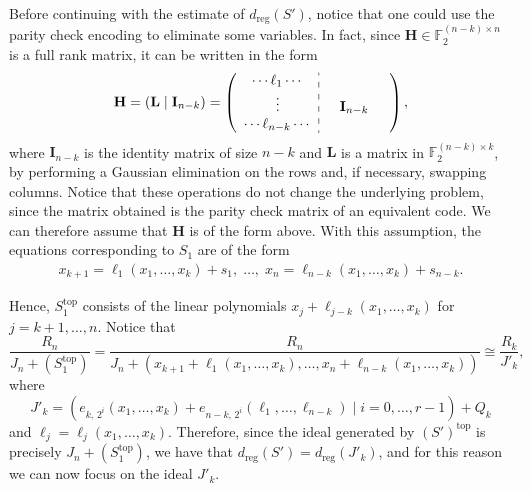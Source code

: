 \documentclass[11pt]{article}
\newcommand{\F}[0]{\mathbb{F}}
\newcommand{\es}[2]{e_{#1,\, #2}}
\DeclarePairedDelimiter{\fl}{\lfloor}{\rfloor}
\theoremstyle{plain}
\theoremstyle{definition}
\theoremstyle{remark}
\begin{document}
Before continuing with the estimate of $d_{\operatorname{reg}}(S')$, notice that one could use the parity check encoding to eliminate some variables. In fact, since $\mathbf{H}\in\F_2^{(n-k)\times n}$ is a full rank matrix, it can be written in the form 
\begin{equation*}
    \mathbf{H}=(\mathbf{L}\mid \mathbf{I}_{n-k})=
    \left(\begin{array}{c : c}
        \cdots\ell_{1}\cdots & \\
        \vdots & \quad \mathbf{I}_{n-k}\quad \\
        \cdots\ell_{n-k}\cdots & \\
    \end{array}\right),
\end{equation*}%
where $\mathbf{I}_{n-k}$ is the identity matrix of size $n-k$ and $\mathbf{L}$ is a matrix in $\F_2^{(n-k)\times k}$, by performing a Gaussian elimination on the rows and, if necessary, swapping columns. Notice that these operations do not change the underlying problem, since the matrix obtained is the parity check matrix of an equivalent code. We can therefore assume that $\mathbf{H}$ is of the form above. With this assumption, the equations corresponding to $S_1$ are of the form
\begin{align*}
        x_{k+1}=\ell_1(x_1,\dots,x_k)+s_1,\;\dots,\;x_n=\ell_{n-k}(x_1,\dots,x_k)+s_{n-k}.
\end{align*}

Hence, $S_1^{\operatorname{top}}$ consists of the linear polynomials $x_j+\ell_{j-k}(x_1,\dots,x_k)$ for $j=k+1,\dots,n$. Notice that
\begin{equation*}
    \frac{R_n}{J_n+(S_1^{\operatorname{top}})}=\frac{R_n}{J_n+(x_{k+1}+\ell_1(x_1,\dots,x_k),\dots,x_n +\ell_{n-k}(x_1,\dots,x_k))}\cong\frac{R_k}{J'_k},
\end{equation*}
where
\begin{equation*}
    J'_k=(\es{k}{2^i}(x_1,\dots,x_k)+\es{n-k}{2^i}(\ell_1,\dots,\ell_{n-k})\mid i=0,\dots,r-1)+Q_k
\end{equation*}
and $\ell_j=\ell_j(x_1,\dots,x_k)$. Therefore, since the ideal generated by $(S')^{\operatorname{top}}$ is precisely $J_n+(S_1^{\operatorname{top}})$, we have that $d_{\operatorname{reg}}(S')=d_{\operatorname{reg}}(J'_k)$, and for this reason we can now focus on the ideal $J'_k$. 
\end{document}
